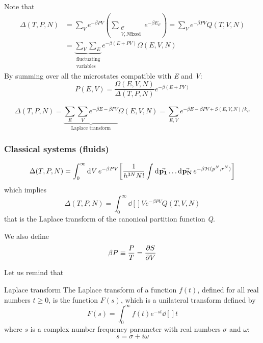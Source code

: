 \documentclass[../../Main/Main.tex]{subfiles}
\begin{document}
\begin{remark}

Note that
\begin{equation*}
\begin{split}
\Delta (T,P,N)  &=  \sum_{V}^{} e^{-\beta PV } (\sum_{\substack{ \mathcal{C} \\ V,N \text{fixed}} }^{} e^{-\beta E_{\mathcal{C}}}  ) =  \sum_{V}^{} e^{-\beta PV} Q (T,V,N)       \\
& = \underbrace{\sum_{V}^{} \sum_{E}^{}}_{\substack{ \text{fluctuating} \\  \text{variables} } }  e^{-\beta (E+PV)} \Omega (E,V,N)
\end{split}
\end{equation*}
By summing over all the microstates compatible with \emph{E} and \emph{V}:
\begin{equation}
  P (E,V) = \frac{\Omega (E,V,N)}{\Delta (T,P,N)} e^{-\beta (E+PV)}
\end{equation}
\end{remark}
\begin{remark}
\begin{equation}
  \Delta (T,P,N) = \underbrace{ \sum_{E}^{} \sum_{V}^{} e^{-\beta E - \beta PV}}_{\text{Laplace transform}} \Omega (E,V,N) = \sum_{E,V}^{} e^{-\beta E- \beta PV + S(E,V,N)/k_B}
  \label{eq:4_5}
\end{equation}
\end{remark}




\subsubsection{Classical systems (fluids)}
\begin{equation}
  \Delta (T,P,N) = \int_{0}^{\infty } \dd[]{V} e^{-\beta PV} \qty[ \frac{1}{h^{3N}N!} \int_{}^{} \dd[]{\va{p_1}} \dots \dd[]{\va{p_N}} e^{-\beta \mathcal{H}(p^N,r^N)} ]
\end{equation}
which implies
\begin{equation}
  \Delta (T,P,N) = \int_{0}^{\infty } \dd[]{V} e^{-\beta PV} Q(T,V,N)
\end{equation}
that is the Laplace transform of the canonical partition function \emph{Q}.  

We also define
\begin{equation}
  \beta P \equiv \frac{P}{T} = \pdv{S}{V}
\end{equation}
\begin{remark}
Let us remind that
\begin{definition}{Laplace transform}{}
The Laplace transform of a function \(f(t) \), defined for all real numbers \(t \geq 0\), is the function \(F(s)\), which is a unilateral transform defined by
\begin{equation*}
 F(s)=\int _{0}^{\infty }f(t)e^{-st}  \dd[]{t}	
 \end{equation*}
 where \(s\) is a complex number frequency parameter  with real numbers \( \sigma \) and \( \omega \):
\begin{equation*}
    s=\sigma +i\omega 
\end{equation*}
\end{definition}
\end{remark}
\end{document}
